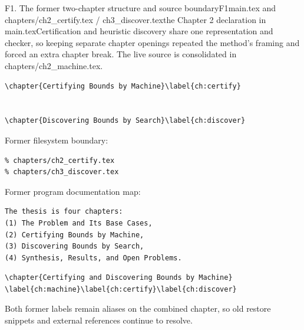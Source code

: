 \begin{offcutrewrite}{F1. The former two-chapter structure and source boundary}{F1}{main.tex and chapters/ch2\_certify.tex / ch3\_discover.tex}{the Chapter 2 declaration in main.tex}{Certification and heuristic discovery share one representation and checker, so keeping separate chapter openings repeated the method's framing and forced an extra chapter break. The live source is consolidated in chapters/ch2\_machine.tex.}
\begin{verbatim}
\chapter{Certifying Bounds by Machine}\label{ch:certify}


\chapter{Discovering Bounds by Search}\label{ch:discover}

\end{verbatim}

Former filesystem boundary:
\begin{verbatim}
% chapters/ch2_certify.tex
% chapters/ch3_discover.tex
\end{verbatim}

Former program documentation map:
\begin{verbatim}
The thesis is four chapters:
(1) The Problem and Its Base Cases,
(2) Certifying Bounds by Machine,
(3) Discovering Bounds by Search,
(4) Synthesis, Results, and Open Problems.
\end{verbatim}
\nowreads
\begin{verbatim}
\chapter{Certifying and Discovering Bounds by Machine}
\label{ch:machine}\label{ch:certify}\label{ch:discover}

\end{verbatim}
Both former labels remain aliases on the combined chapter, so old restore snippets and external references continue to resolve.
\end{offcutrewrite}

